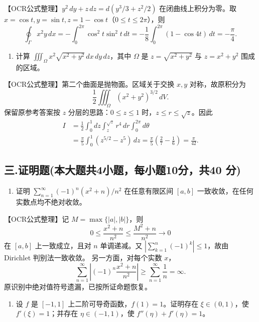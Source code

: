 \documentclass[11pt,fontset=fandol]{ctexart}
\providecommand{\tightlist}{\setlength{\itemsep}{0pt}\setlength{\parskip}{0pt}}
\begin{document}
【OCR公式整理】\(y^2\,dy+z\,dz=d(y^3/3+z^2/2)\) 在闭曲线上积分为零。取
\(x=\cos t,y=\sin t,z=1-\cos t\)（\(0\le t\le2\pi\)），则 \[
\oint_\Gamma x^2y\,dx
=-\int_0^{2\pi}\cos^2t\sin^2t\,dt
=-\frac18\int_0^{2\pi}(1-\cos4t)\,dt=-\frac\pi4.
\]

\begin{enumerate}
\def\labelenumi{\arabic{enumi}.}
\setcounter{enumi}{4}
\tightlist
\item
  计算 \(\iiint_\Omega x^2\sqrt{x^2+y^2}\,dx\,dy\,dz\)，其中 \(\Omega\)
  是 \(z=\sqrt{x^2+y^2}\) 与 \(z=x^2+y^2\) 围成的区域。
\end{enumerate}

【OCR公式整理】第二个曲面是抛物面。区域关于交换 \(x,y\) 对称，故原积分为
\[
\frac12\iiint_\Omega(x^2+y^2)^{3/2}\,dV.
\] 保留原参考答案按 \(z\) 分层的思路：\(0\le z\le1\)
时，\(z\le r\le\sqrt z\)。因此 \[
\begin{aligned}
I&=\frac12\int_0^1dz\int_z^{\sqrt z}r^4\,dr\int_0^{2\pi}d\theta\\
&=\frac\pi5\int_0^1(z^{5/2}-z^5)\,dz
=\frac\pi5\left(\frac27-\frac16\right)=\frac\pi{42}.
\end{aligned}
\]

\subsection{三.证明题(本大题共4小题，每小题10分，共40
分)}\label{ux4e09.ux8bc1ux660eux9898ux672cux5927ux9898ux51714ux5c0fux9898ux6bcfux5c0fux989810ux5206ux517140-ux5206}

\begin{enumerate}
\def\labelenumi{\arabic{enumi}.}
\tightlist
\item
  证明 \(\sum_{n=1}^\infty(-1)^n(x^2+n)/n^2\) 在任意有限区间 \([a,b]\)
  一致收敛，在任何实数点均不绝对收敛。
\end{enumerate}

【OCR公式整理】记 \(M=\max\{|a|,|b|\}\)，则 \[
0\le\frac{x^2+n}{n^2}\le\frac{M^2+n}{n^2}\to0
\] 在 \([a,b]\) 上一致成立，且对 \(n\) 单调递减。又
\(\left|\sum_{k=1}^n(-1)^k\right|\le1\)，故由 Dirichlet 判别法一致收敛。
另一方面，对每个实数 \(x\)， \[
\sum_{n=1}^\infty\left|(-1)^n\frac{x^2+n}{n^2}\right|
\ge\sum_{n=1}^\infty\frac1n=\infty.
\] 原识别中绝对值符号遗漏，已按所证命题恢复。

\begin{enumerate}
\def\labelenumi{\arabic{enumi}.}
\setcounter{enumi}{1}
\tightlist
\item
  设 \(f\) 是 \([-1,1]\) 上二阶可导奇函数，\(f(1)=1\)。证明存在
  \(\xi\in(0,1)\)，使 \(f'(\xi)=1\)；并存在 \(\eta\in(-1,1)\)，使
  \(f''(\eta)+f'(\eta)=1\)。
\end{enumerate}
\end{document}
